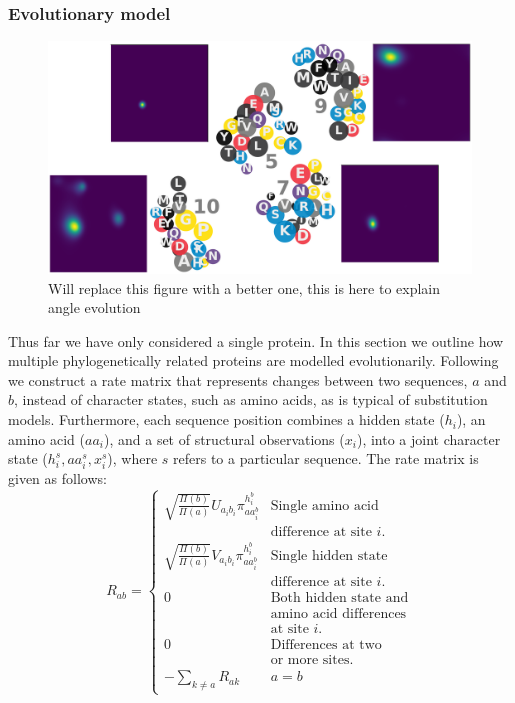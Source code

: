 \documentclass[nogrid]{MBE}%
\begin{document}
\subsubsection{Evolutionary model}
\begin{figure}
	\centering
	\includegraphics[width=2.0\columnwidth]{figures/rate-network-withstructure.pdf}
	\caption{Will replace this figure with a better one, this is here to explain angle evolution}%
	\label{fig:ratenetwork}%
\end{figure}
Thus far we have only considered a single protein. In this section we outline how multiple phylogenetically related proteins are modelled evolutionarily. Following \citet{choi2008basing} we construct a rate matrix that represents changes between two sequences, $a$ and $b$, instead of character states, such as amino acids, as is typical of substitution models. Furthermore, each sequence position combines a hidden state ($h_i$), an amino acid ($aa_i$), and a set of structural observations ($x_i$), into a joint character state ($h^{s}_i,aa^{s}_i,x^{s}_i$), where $s$ refers to a particular sequence. The rate matrix is given as follows:
\begin{equation}
\label{eq:ratematrix}
R_{ab}=\begin{cases}

\sqrt{\frac{\Pi(b)}{\Pi(a)}}U_{a_{i}b_{i}}\pi^{h^{b}_{i}}_{aa^{b}_{i}} & \text{Single amino acid}\\
& \text{difference at site $i$.}\\ 

\sqrt{\frac{\Pi(b)}{\Pi(a)}}V_{a_{i}b_{i}}\pi^{h^{b}_{i}}_{aa^{b}_{i}} & \text{Single hidden state}\\
& \text{difference at site $i$.}\\ 

0 & \text{Both hidden state and}\\
& \text{amino acid differences}\\
& \text{at site $i$.}\\ 

0 & \text{Differences at two}\\
& \text{or more sites.}\\

-\underset{k\neq a}{\sum}R_{ak} & a=b
\end{cases}
\end{equation}
\end{document}
